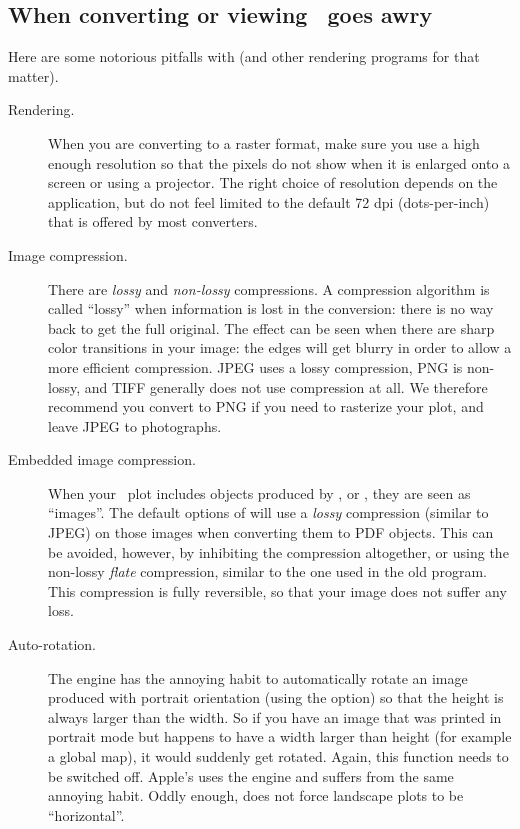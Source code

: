 \subsection{When converting or viewing \PS\ goes awry}
Here are some notorious pitfalls with  (and other rendering programs for that matter).
\begin{description}
\item[Rendering.] When you are converting to a raster format, make sure you use a high enough resolution so that the pixels do not show when it is enlarged onto a screen or using a projector. The right choice of resolution depends on the application, but do not feel limited to the default 72 dpi (dots-per-inch) that is offered by most converters.

\item[Image compression.] There are \emph{lossy} and \emph{non-lossy} compressions. A compression algorithm is called ``lossy'' when information is lost in the conversion: there is no way back to get the full original. The effect can be seen when there are sharp color transitions in your image: the edges will get blurry in order to allow a more efficient compression. JPEG uses a lossy compression, PNG is non-lossy, and TIFF generally does not use compression at all. We therefore recommend you convert to PNG if you need to rasterize your plot, and leave JPEG to photographs.

\item[Embedded image compression.] When your \GMT\ plot includes objects produced by ,  or , they are seen as ``images''. The default options of  will use a \emph{lossy} compression (similar to JPEG) on those images when converting them to PDF objects. This can be avoided, however, by inhibiting the compression altogether, or using the non-lossy \emph{flate} compression, similar to the one used in the old  program. This compression is fully reversible, so that your image does not suffer any loss.

\item[Auto-rotation.] The  engine has the annoying habit to automatically rotate an image produced with portrait orientation (using the  option) so that the height is always larger than the width. So if you have an image that was printed in portrait mode but happens to have a width larger than height (for example a global map), it would suddenly get rotated. Again, this function needs to be switched off. Apple's  uses the  engine and suffers from the same annoying habit. Oddly enough,  does not force landscape plots to be ``horizontal''.


\end{description}
